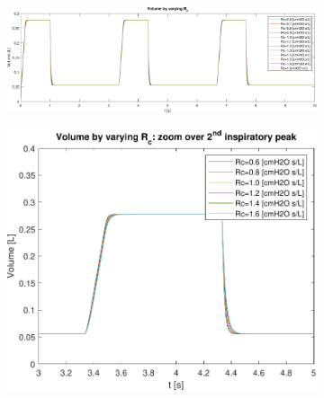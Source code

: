 \begin{figure}[t!]
\begin{subfigure}{0.5\linewidth}
	\caption{}
\end{subfigure}\hfill
\caption{}
\begin{subfigure}{0.7\linewidth}
	\centering
	\includegraphics[width=0.95\linewidth]{../model/data_log/Rc_volume_total.pdf}
	\caption{}
\end{subfigure}\hfill
\begin{subfigure}{0.3\linewidth}
	\centering
	\includegraphics[width=0.95\linewidth]{../model/data_log/Rc_volume_zoom.pdf}
	\caption{}
\end{subfigure}\hfill
\caption{}
\end{figure}


